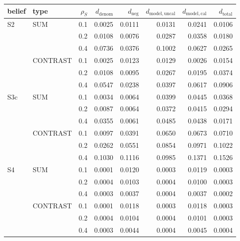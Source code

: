 \footnotesize
\begin{tabular}{llrrrrrr}
\toprule
belief & type & $\rho_S$ & $d_{\mathrm{denom}}$ & $d_{\mathrm{neg}}$ & $d_{\mathrm{model,uncal}}$ & $d_{\mathrm{model,cal}}$ & $d_{\mathrm{total}}$ \\
\midrule
S2 & SUM & 0.1 & 0.0025 & 0.0111 & 0.0131 & 0.0241 & 0.0106 \\
 &  & 0.2 & 0.0108 & 0.0076 & 0.0287 & 0.0358 & 0.0180 \\
 &  & 0.4 & 0.0736 & 0.0376 & 0.1002 & 0.0627 & 0.0265 \\
 & CONTRAST & 0.1 & 0.0025 & 0.0123 & 0.0129 & 0.0026 & 0.0154 \\
 &  & 0.2 & 0.0108 & 0.0095 & 0.0267 & 0.0195 & 0.0374 \\
 &  & 0.4 & 0.0547 & 0.0238 & 0.0397 & 0.0617 & 0.0906 \\
\midrule
S3c & SUM & 0.1 & 0.0034 & 0.0064 & 0.0399 & 0.0445 & 0.0368 \\
 &  & 0.2 & 0.0087 & 0.0064 & 0.0372 & 0.0415 & 0.0294 \\
 &  & 0.4 & 0.0355 & 0.0061 & 0.0485 & 0.0438 & 0.0171 \\
 & CONTRAST & 0.1 & 0.0097 & 0.0391 & 0.0650 & 0.0673 & 0.0710 \\
 &  & 0.2 & 0.0262 & 0.0551 & 0.0854 & 0.0971 & 0.1022 \\
 &  & 0.4 & 0.1030 & 0.1116 & 0.0985 & 0.1371 & 0.1526 \\
\midrule
S4 & SUM & 0.1 & 0.0001 & 0.0120 & 0.0003 & 0.0119 & 0.0003 \\
 &  & 0.2 & 0.0004 & 0.0103 & 0.0004 & 0.0100 & 0.0003 \\
 &  & 0.4 & 0.0003 & 0.0037 & 0.0004 & 0.0037 & 0.0002 \\
 & CONTRAST & 0.1 & 0.0001 & 0.0118 & 0.0003 & 0.0118 & 0.0003 \\
 &  & 0.2 & 0.0004 & 0.0104 & 0.0004 & 0.0101 & 0.0003 \\
 &  & 0.4 & 0.0003 & 0.0044 & 0.0004 & 0.0045 & 0.0004 \\
\bottomrule
\end{tabular}
